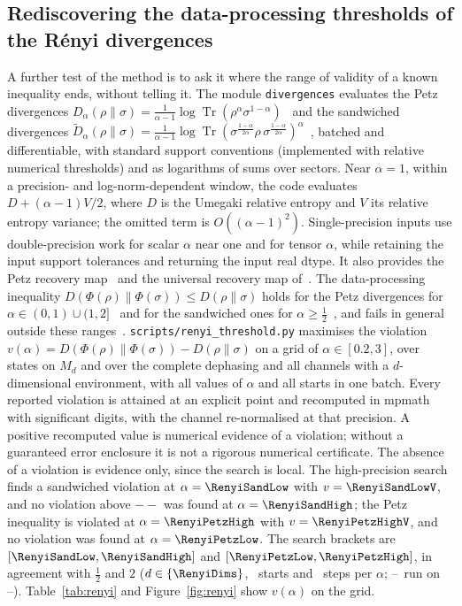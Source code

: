 \documentclass[11pt]{article}
\DeclareMathOperator{\Tr}{Tr}
\providecommand{\RenyiMode}{--}\providecommand{\RenyiDevice}{--}\providecommand{\RenyiTol}{--}
\newcommand{\G}[3]{\IfFileExists{generated/#1.tex}{#2}{#3}}
\begin{document}
\subsection{Rediscovering the data-processing thresholds of the Rényi divergences}\label{sec:renyi}

A further test of the method is to ask it where the range of validity of a known inequality ends, without telling it.
The module \texttt{divergences} evaluates the Petz divergences
$D_\alpha(\rho\|\sigma)=\frac{1}{\alpha-1}\log\Tr(\rho^\alpha\sigma^{1-\alpha})$~\cite{petz1986} and the sandwiched
divergences $\widetilde D_\alpha(\rho\|\sigma)=\frac{1}{\alpha-1}\log\Tr(\sigma^{\frac{1-\alpha}{2\alpha}}\rho\,
\sigma^{\frac{1-\alpha}{2\alpha}})^{\alpha}$~\cite{mullerlennert2013,wilde2014}, batched and differentiable, with standard
support conventions (implemented with relative numerical thresholds) and as logarithms of sums over sectors.
Near $\alpha=1$, within a precision- and log-norm-dependent window, the code evaluates
$D+(\alpha-1)V/2$, where $D$ is the Umegaki relative entropy and $V$ its relative entropy variance; the omitted term
is $O((\alpha-1)^2)$. Single-precision inputs use double-precision work for scalar $\alpha$ near one and for tensor
$\alpha$, while retaining the input support tolerances and returning the input real dtype. It also provides the Petz recovery
map~\cite{petz1986suff,petz1988chan} and the universal recovery map of~\cite{junge2018}. The data-processing
inequality $D(\Phi(\rho)\|\Phi(\sigma))\le D(\rho\|\sigma)$ holds for the Petz divergences for
$\alpha\in(0,1)\cup(1,2]$~\cite{petz1986} and for the sandwiched ones for
$\alpha\ge\frac12$~\cite{mullerlennert2013,wilde2014,beigi2013,frank2013}, and fails in general outside these
ranges~\cite{mullerlennert2013,berta2017,zhang2020}. \texttt{scripts/renyi\_threshold.py} maximises the violation
$v(\alpha)=D(\Phi(\rho)\|\Phi(\sigma))-D(\rho\|\sigma)$ on a grid of $\alpha\in[0.2,3]$, over states on $M_d$ and over
the complete dephasing and all channels with a $d$-dimensional environment, with all values of $\alpha$ and all starts
in one batch. Every reported violation is attained at an explicit point and recomputed in mpmath with
\G{renyi_threshold}{\RenyiDigits}{50} significant digits, with the channel re-normalised at that precision.
A positive recomputed value is numerical evidence of a violation; without a guaranteed error enclosure it is not a
rigorous numerical certificate. The absence of a violation is evidence only, since the search is local.
\ifdefined\RenyiSandLow The high-precision search finds a sandwiched violation at
$\alpha=\RenyiSandLow$ with $v=\RenyiSandLowV$, and no violation above $\RenyiTol$ was found at
$\alpha=\RenyiSandHigh$; the Petz inequality is violated at $\alpha=\RenyiPetzHigh$ with $v=\RenyiPetzHighV$, and no
violation was found at $\alpha=\RenyiPetzLow$. The search brackets are $[\RenyiSandLow,\RenyiSandHigh]$ and
$[\RenyiPetzLow,\RenyiPetzHigh]$, in agreement with $\frac12$ and $2$ ($d\in\{\RenyiDims\}$, \RenyiStarts\ starts and
\RenyiSteps\ steps per $\alpha$; \RenyiMode\ run on \RenyiDevice). Table~\ref{tab:renyi} and Figure~\ref{fig:renyi}
show $v(\alpha)$ on the grid.
\end{document}
